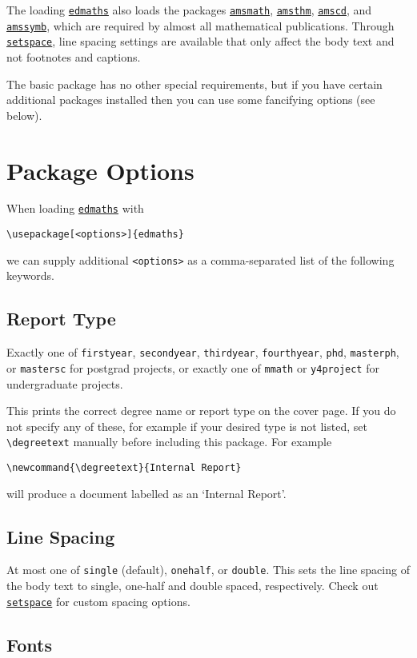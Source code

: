 \documentclass[12pt]{article}
\newcommand\pkg[1]{\href{https://www.ctan.org/pkg/#1}{\color{teal}\lstinline{#1}}}
\newcommand\key[1]{{\color{orange}\lstinline|#1|}}
\begin{document}
The loading \pkg{edmaths} also loads the packages \pkg{amsmath}, \pkg{amsthm}, \pkg{amscd}, and \pkg{amssymb}, which are required by almost all mathematical publications. Through \pkg{setspace}, line spacing settings are available that only affect the body text and not footnotes and captions.

The basic package has no other special requirements, but if you have certain additional packages installed then you can use some fancifying options (see below).

\section{Package Options}

When loading \pkg{edmaths} with
\begin{lstlisting}
\usepackage[<options>]{edmaths}
\end{lstlisting}
we can supply additional \key{<options>} as a comma-separated list of the following keywords.

\subsection{Report Type}

Exactly one of \key{firstyear}, \key{secondyear}, \key{thirdyear}, \key{fourthyear}, \key{phd}, \key{masterph}, or \key{mastersc} for postgrad projects, or exactly one of \key{mmath} or \key{y4project} for undergraduate projects.

This prints the correct degree name or report type on the cover page. If you do not specify any of these, for example if your desired type is not listed, set \lstinline|\degreetext| manually before including this package. For example
\begin{lstlisting}
\newcommand{\degreetext}{Internal Report}
\end{lstlisting}
will produce a document labelled as an `Internal Report'.

\subsection{Line Spacing}

At most one of \key{single} (default), \key{onehalf}, or \key{double}. This sets the line spacing of the body text to single, one-half and double spaced, respectively. Check out \pkg{setspace} for custom spacing options.

\subsection{Fonts}
\end{document}
